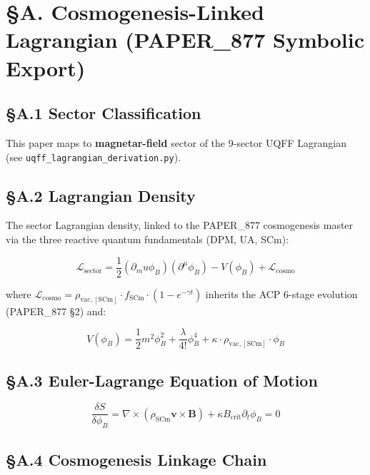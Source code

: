 \documentclass[12pt,a4paper]{article}
\begin{document}
\section{\S{}A. Cosmogenesis-Linked Lagrangian (PAPER\_877 Symbolic Export)}

\subsection{\S{}A.1 Sector Classification}

This paper maps to \textbf{magnetar-field} sector of the 9-sector UQFF Lagrangian (see \texttt{uqff\_{lagrangian\_derivation}.py}).

\subsection{\S{}A.2 Lagrangian Density}

The sector Lagrangian density, linked to the PAPER\_877 cosmogenesis master via the three reactive quantum fundamentals (DPM, UA, SCm):

\begin{equation}
\mathcal{L}_{\mathrm{sector}} = \frac{1}{2}(\partial_mu \phi_B)(\partial^\mu \phi_B) - V(\phi_B) + \mathcal{L}_{\mathrm{cosmo}}
\end{equation}

where $\mathcal{L}_{\mathrm{cosmo}} = \rho_{\mathrm{vac,[SCm]}} \cdot f_{\mathrm{SCm}} \cdot (1 - e^{-\gamma t})$ inherits the ACP 6-stage evolution (PAPER\_877 \S{}2) and:

\begin{equation}
V(\phi_B) = \frac{1}{2} m^2 \phi_B^2 + \frac{\lambda}{4!} \phi_B^4 + \kappa \cdot \rho_{\mathrm{vac,[SCm]}} \cdot \phi_B
\end{equation}

\subsection{\S{}A.3 Euler-Lagrange Equation of Motion}

\begin{equation}
\boxed{\frac{\delta S}{\delta \phi_B} = \nabla \times (\rho_{\mathrm{SCm}} \mathbf{v} \times \mathbf{B}) + \kappa B_{\mathrm{crit}} \partial_t \phi_B = 0}
\end{equation}

\subsection{\S{}A.4 Cosmogenesis Linkage Chain}
\end{document}
